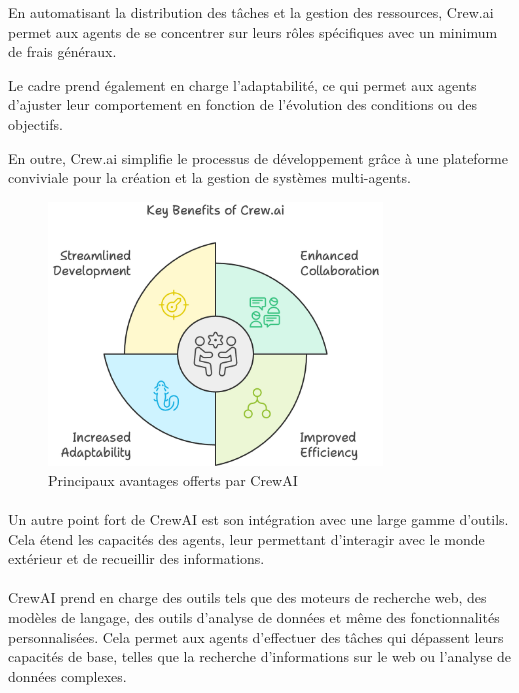 \medskip

\noindent
En automatisant la distribution des tâches et la gestion des ressources, Crew.ai permet aux agents de se concentrer sur leurs rôles spécifiques avec un minimum de frais généraux.

\medskip

\noindent
Le cadre prend également en charge l'adaptabilité, ce qui permet aux agents d'ajuster leur comportement en fonction de l'évolution des conditions ou des objectifs.

\medskip

\noindent
En outre, Crew.ai simplifie le processus de développement grâce à une plateforme conviviale pour la création et la gestion de systèmes multi-agents.
\begin{figure}[h]
    \centering
    \includegraphics[width=\linewidth, height=7cm]{images/key benefits of.png}
    \caption{Principaux avantages offerts par CrewAI} 
\end{figure}


\paragraph{}
Un autre point fort de CrewAI est son intégration avec une large gamme d'outils. Cela étend les capacités des agents, leur permettant d'interagir avec le monde extérieur et de recueillir des informations.
\paragraph{}
CrewAI prend en charge des outils tels que des moteurs de recherche web, des modèles de langage, des outils d'analyse de données et même des fonctionnalités personnalisées. Cela permet aux agents d'effectuer des tâches qui dépassent leurs capacités de base, telles que la recherche d'informations sur le web ou l'analyse de données complexes.

